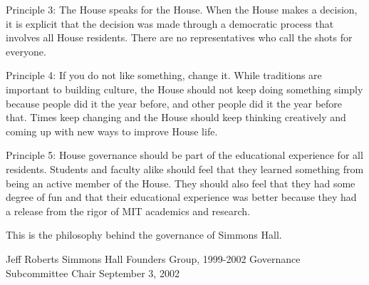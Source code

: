 \documentclass[letterpaper]{article}
\begin{document}
Principle 3: The House speaks for the House. When the House makes a
decision, it is explicit that the decision was made through a
democratic process that involves all House residents. There are no
representatives who {\textquotedbl}call the shots{\textquotedbl} for
everyone.

Principle 4: If you do not like something, change it. While traditions
are important to building culture, the House should not keep doing
something simply because people did it the year before, and other
people did it the year before that. Times keep changing and the House
should keep thinking creatively and coming up with new ways to improve
House life.

Principle 5: House governance should be part of the educational
experience for all residents. Students and faculty alike should feel
that they learned something from being an active member of the House.
They should also feel that they had some degree of fun and that their
educational experience was better because they had a release from the
rigor of MIT academics and research.

This is the philosophy behind the governance of Simmons Hall.

Jeff Roberts\newline
Simmons Hall Founders Group, 1999-2002\newline
Governance Subcommittee Chair\newline
September 3, 2002
\end{document}
